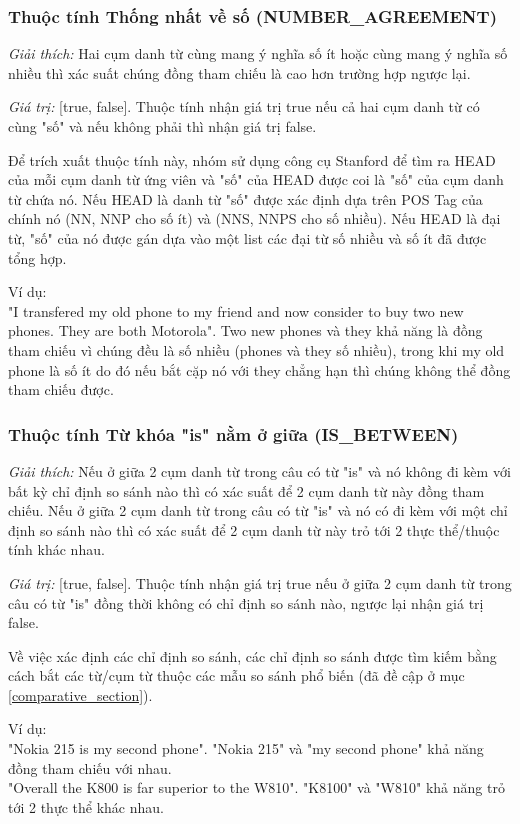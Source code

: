\documentclass[12pt]{extarticle}
\begin{document}
			\subsubsection*{Thuộc tính Thống nhất về số (NUMBER\_AGREEMENT)}
				\par \textit{Giải thích:} Hai cụm danh từ cùng mang ý nghĩa số ít hoặc cùng mang ý nghĩa số nhiều thì xác suất chúng đồng tham chiếu là cao hơn trường hợp ngược lại. 
				\par \textit{Giá trị:} [true, false]. Thuộc tính nhận giá trị true nếu cả hai cụm danh từ có cùng "số" và nếu không phải thì nhận giá trị false.
				\par Để trích xuất thuộc tính này, nhóm sử dụng công cụ Stanford để tìm ra HEAD của mỗi cụm danh từ ứng viên và "số" của HEAD được coi là "số" của cụm danh từ chứa nó. Nếu HEAD là danh từ "số" được xác định dựa trên POS Tag của chính nó (NN, NNP cho số ít) và (NNS, NNPS cho số nhiều). Nếu HEAD là đại từ, "số" của nó được gán dựa vào một list các đại từ số nhiều và số ít đã được tổng hợp.
				\par Ví dụ:
				\\"I transfered my old phone to my friend and now consider to buy two new phones. They are both Motorola". Two new phones và they khả năng là đồng tham chiếu vì chúng đều là số nhiều (phones và they số nhiều), trong khi my old phone là số ít do đó nếu bắt cặp nó với they chẳng hạn thì chúng không thể đồng tham chiếu được.				

			\subsubsection*{Thuộc tính Từ khóa "is" nằm ở giữa (IS\_BETWEEN)}
				\par \textit{Giải thích:} Nếu ở giữa 2 cụm danh từ trong câu có từ "is" và nó không đi kèm với bất kỳ chỉ định so sánh nào thì có xác suất để 2 cụm danh từ này đồng tham chiếu. Nếu ở giữa 2 cụm danh từ trong câu có từ "is" và nó có đi kèm với một chỉ định so sánh nào thì có xác suất để 2 cụm danh từ này trỏ tới 2 thực thể/thuộc tính khác nhau.
				\par \textit{Giá trị:} [true, false]. Thuộc tính nhận giá trị true nếu ở giữa 2 cụm danh từ trong câu có từ "is" đồng thời không có chỉ định so sánh nào, ngược lại nhận giá trị false.
				\par Về việc xác định các chỉ định so sánh, các chỉ định so sánh được tìm kiếm bằng cách bắt các từ/cụm từ thuộc các mẫu so sánh phổ biến (đã đề cập ở mục \ref{comparative_section}).
				\par Ví dụ: 
				\\"Nokia 215 is my second phone". "Nokia 215" và "my second phone" khả năng đồng tham chiếu với nhau.
				\\"Overall the K800 is far superior to the W810". "K8100" và "W810" khả năng trỏ tới 2 thực thể khác nhau.
\end{document}
